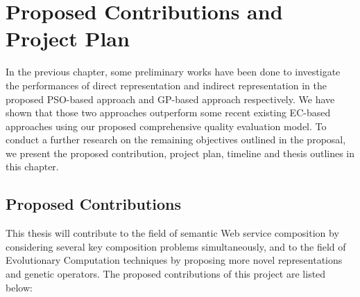 \chapter{Proposed Contributions and Project Plan}\label{C:plan}
In the previous chapter, some preliminary works have been done to investigate the performances of direct representation and indirect representation in the proposed PSO-based approach and GP-based approach respectively. We have shown that those two approaches outperform some recent existing EC-based approaches using our proposed comprehensive quality evaluation model. To conduct a further research on the remaining objectives outlined in the proposal, we present the proposed contribution, project plan, timeline and thesis outlines in this chapter.

\section{Proposed Contributions}
This thesis will contribute to the field of semantic Web service composition by considering several key composition problems simultaneously, and to the field of Evolutionary Computation techniques by proposing more novel representations and genetic operators. The proposed contributions of this project are listed below:

